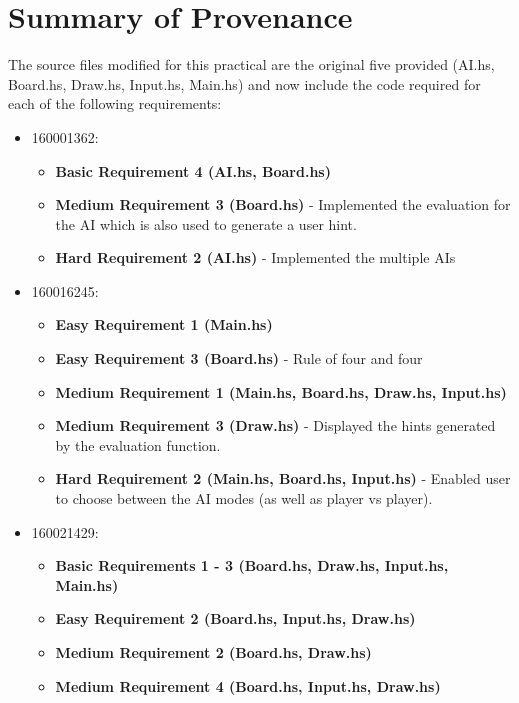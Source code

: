 \documentclass[11]{article}
\begin{document}
	\section{Summary of Provenance}
			The source files modified for this practical are the original five provided (AI.hs, Board.hs, Draw.hs, Input.hs, Main.hs) and now include the code required for each of the following requirements:
			\begin{itemize}
				\item 160001362:
					\begin{itemize}
						\item \textbf{Basic Requirement 4 (AI.hs, Board.hs)}
						\item \textbf{Medium Requirement 3 (Board.hs)} - Implemented the evaluation for the AI which is also used to generate a user hint.
						\item \textbf{Hard Requirement 2 (AI.hs)} - Implemented the multiple AIs
					\end{itemize}
					
				\item 160016245:
					\begin{itemize}
						\item \textbf{Easy Requirement 1 (Main.hs)}
						\item \textbf{Easy Requirement 3 (Board.hs)} - Rule of four and four
						\item \textbf{Medium Requirement 1 (Main.hs, Board.hs, Draw.hs, Input.hs)}
						\item \textbf{Medium Requirement 3 (Draw.hs)} - Displayed the hints generated by the evaluation function.
						\item \textbf{Hard Requirement 2 (Main.hs, Board.hs, Input.hs)} - Enabled user to choose between the AI modes (as well as player vs player).
					\end{itemize}
					
				\item 160021429:
					\begin{itemize}
						\item \textbf{Basic Requirements 1 - 3 (Board.hs, Draw.hs, Input.hs, Main.hs)}
						\item \textbf{Easy Requirement 2 (Board.hs, Input.hs, Draw.hs)}
						\item \textbf{Medium Requirement 2 (Board.hs, Draw.hs)}
						\item \textbf{Medium Requirement 4 (Board.hs, Input.hs, Draw.hs)}
					\end{itemize}
			\end{itemize}
				
\end{document}

